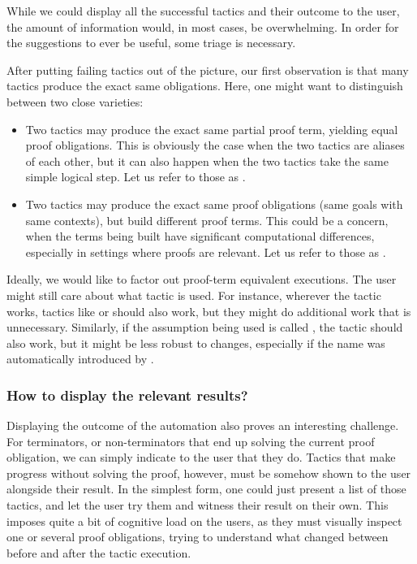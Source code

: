 While we could display all the successful tactics and their outcome to the user,
the amount of information would, in most cases, be overwhelming.  In order for
the suggestions to ever be useful, some triage is necessary.

After putting failing tactics out of the picture, our first observation is that
many tactics produce the exact same obligations.  Here, one might want to
distinguish between two close varieties:

\begin{itemize}

  \item Two tactics may produce the exact same partial proof term, yielding
equal proof obligations.  This is obviously the case when the two tactics are
aliases of each other, but it can also happen when the two tactics take the same
simple logical step.  Let us refer to those as .

  \item Two tactics may produce the exact same proof obligations (same goals
with same contexts), but build different proof terms.  This could be a concern,
when the terms being built have significant computational differences,
especially in settings where proofs are relevant.  Let us refer to those as
.

\end{itemize}

Ideally, we would like to factor out proof-term equivalent executions.  The user
might still care about what tactic is used.  For instance, wherever the
 tactic works, tactics like  or
 should also work, but they might do additional work that
is unnecessary.  Similarly, if the assumption being used is called
, the tactic  should also work, but it might be
less robust to changes, especially if the name  was
automatically introduced by \Coq{}.

\subsubsection{How to display the relevant results?}

Displaying the outcome of the automation also proves an interesting challenge.
For terminators, or non-terminators that end up solving the current proof
obligation, we can simply indicate to the user that they do.  Tactics that make
progress without solving the proof, however, must be somehow shown to the user
alongside their result.  In the simplest form, one could just present a list of
those tactics, and let the user try them and witness their result on their own.
This imposes quite a bit of cognitive load on the users, as they must visually
inspect one or several proof obligations, trying to understand what changed
between before and after the tactic execution.

